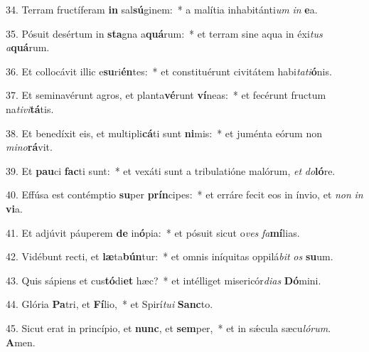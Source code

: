 34. Terram fructíferam \textbf{in} sal\textbf{sú}ginem:~*  a malítia inhabitánti\textit{um} \textit{in} \textbf{e}a.\

35. Pósuit desértum in \textbf{sta}gna a\textbf{quá}rum:~*  et terram sine aqua in éxi\textit{tus} \textit{a}\textbf{quá}rum.\

36. Et collocávit illic e\textbf{su}ri\textbf{én}tes:~*  et constituérunt civitátem habi\textit{ta}\textit{ti}\textbf{ó}nis.\

37. Et seminavérunt agros, et planta\textbf{vé}runt \textbf{ví}neas:~*  et fecérunt fructum na\textit{ti}\textit{vi}\textbf{tá}tis.\

38. Et benedíxit eis, et multipli\textbf{cá}ti sunt \textbf{ni}mis:~*  et juménta eórum non \textit{mi}\textit{no}\textbf{rá}vit.\

39. Et \textbf{pau}ci \textbf{fac}ti sunt:~*  et vexáti sunt a tribulatióne malórum, \textit{et} \textit{do}\textbf{ló}re.\

40. Effúsa est contémptio \textbf{su}per \textbf{prín}cipes:~*  et erráre fecit eos in ínvio, et \textit{non} \textit{in} \textbf{vi}a.\

41. Et adjúvit páuperem \textbf{de} in\textbf{ó}pia:~*  et pósuit sicut o\textit{ves} \textit{fa}\textbf{mí}lias.\

42. Vidébunt recti, et \textbf{læ}ta\textbf{bún}tur:~*  et omnis iníquitas oppilá\textit{bit} \textit{os} \textbf{su}um.\

43. Quis sápiens et cus\textbf{tó}di\textbf{et} hæc?~*  et intélliget misericór\textit{di}\textit{as} \textbf{Dó}mini.\

44. Glória \textbf{Pa}tri, et \textbf{Fí}lio,~*  et Spirí\textit{tu}\textit{i} \textbf{Sanc}to.\

45. Sicut erat in princípio, et \textbf{nunc}, et \textbf{sem}per,~*  et in sǽcula sæcu\textit{ló}\textit{rum}. \textbf{A}men.\

